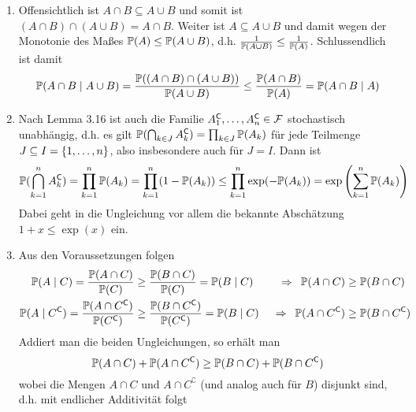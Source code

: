 \begin{exercisePage}
	\begin{enumerate}[leftmargin=*, label=(zu \alph*)]
		\item Offensichtlich ist $A \cap B \subseteq A \cup B$ und somit ist $(A \cap B) \cap (A \cup B) = A \cap B$. Weiter ist $A \subseteq A \cup B$ und damit wegen der Monotonie des Maßes $\P(A) \leq \P(A \cup B)$, d.h. $\frac{1}{\P(A \cup B)} \leq \frac{1}{\P(A)}$. Schlussendlich ist damit
		\begin{equation*}
		\P(A \cap B \mid A \cup B) = \frac{\P( (A \cap B) \cap (A \cup B))}{\P(A \cup B)} \leq \frac{\P(A \cap B)}{\P(A)} = \P(A \cap B \mid A)
		\end{equation*}
		\item Nach Lemma 3.16 ist auch die Familie $A_1^\complement , \dots , A_n^\complement \in \ereignisF$ stochastisch unabhängig, d.h. es gilt $\P(\bigcap_{k \in J} A_k^\complement) = \prod_{k \in J} \P(A_k)$ für jede Teilmenge $J \subseteq I = \menge{1, \dots , n}$, also insbesondere auch für $J = I$. Dann ist
		\begin{equation*}
			\P(\bigcap_{k=1}^n A_k^\complement) = \prod_{k=1}^n \P(A_k) = \prod_{k=1}^n (1 - \P(A_k)) \leq \prod_{k=1}^n \exp(-\P(A_k)) = \exp \left( \sum_{k=1}^n \P(A_k) \right)
		\end{equation*}
		Dabei geht in die Ungleichung vor allem die bekannte Abschätzung $1 + x \leq \exp(x)$ ein.
		\item Aus den Voraussetzungen folgen
		\begin{equation*}
			\begin{aligned}
			\P(A \mid C) = \frac{\P(A \cap C)}{\P(C)} &\geq \frac{\P(B \cap C)}{\P(C)} = \P(B \mid C) &\follows \P(A \cap C) &\geq \P(B \cap C) \\
			\P(A \mid C^\complement) = \frac{\P(A \cap C^\complement)}{\P(C^\complement)} &\geq \frac{\P(B \cap C^\complement)}{\P(C^\complement)} = \P(B \mid C) &\follows \P(A \cap C^\complement) &\geq \P(B \cap C^\complement)
			\end{aligned}
		\end{equation*}
		Addiert man die beiden Ungleichungen, so erhält man
		\begin{equation*}
			\P(A \cap C) + \P(A \cap C^\complement) \geq \P(B \cap C) + \P(B \cap C^\complement)
		\end{equation*}
		wobei die Mengen $A \cap C$ und $A \cap C^\complement$ (und analog auch für $B$) disjunkt sind, d.h. mit endlicher Additivität folgt
		\begin{equation*}
			\begin{aligned}

\end{aligned}
\end{equation*}
\end{enumerate}
\end{exercisePage}
